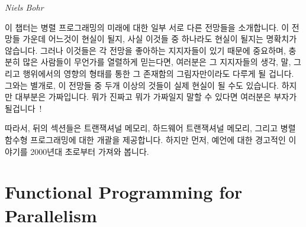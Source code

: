 
%
	 {\emph{Niels Bohr}}

이 챕터는 병렬 프로그래밍의 미래에 대한 일부 서로 다른 전망들을 소개합니다.
이 전망들 가운데 어느것이 현실이 될지, 사실 이것들 중 하나라도 현실이 될지는
명확치가 않습니다.
그러나 이것들은 각 전망을 좋아하는 지지자들이 있기 때문에 중요하며, 충분히 많은
사람들이 무언가를 열렬하게 믿는다면, 여러분은 그 지지자들의 생각, 말, 그리고
행위에서의 영향의 형태를 통한 그 존재함의 그림자만이라도 다루게 될 겁니다.
그와는 별개로, 이 전망들 중 두개 이상의 것들이 실제 현실이 될 수도 있습니다.
하지만 대부분은 가짜입니다.
뭐가 진짜고 뭐가 가짜일지 말할 수 있다면 여러분은 부자가
될겁니다~\cite{KeithRSpitz1977}!

따라서, 뒤의 섹션들은 트랜잭셔널 메모리, 하드웨어 트랜잭셔널 메모리, 그리고
병렬 함수형 프로그래밍에 대한 개괄을 제공합니다.
하지만 먼저, 예언에 대한 경고적인 이야기를 2000년대 초로부터 가져와 봅니다.
\iffalse

This chapter presents some conflicting visions of the future of parallel
programming.
It is not clear which of these will come to pass, in fact, it is not
clear that any of them will.
They are nevertheless important because each vision has its devoted
adherents, and if enough people believe in something fervently enough,
you will need to deal with at least the shadow of that thing's existence
in the form of its
influence on the thoughts, words, and deeds of its adherents.
Besides which, it is entirely possible that one or more of these visions
will actually come to pass.
But most are bogus.
Tell which is which and you'll be rich~\cite{KeithRSpitz1977}!

Therefore, the following sections give an overview of transactional
memory, hardware transactional memory,
formal verification in regression testing, and
parallel functional programming.
But first, a cautionary tale on prognostication taken from the early 2000s.
\fi






\section{Functional Programming for Parallelism}
\label{sec:future:Functional Programming for Parallelism}

